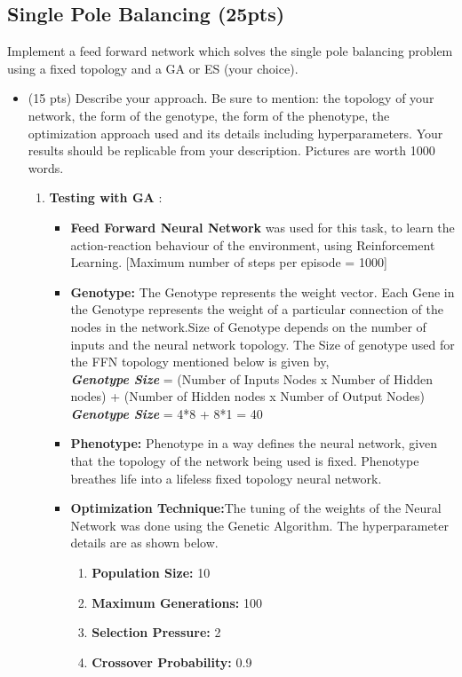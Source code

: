 \documentclass{article}
\begin{document}
\subsection{Single Pole Balancing (25pts)}
Implement a feed forward network which solves the single pole balancing problem using a fixed topology and a GA or ES (your choice).
\begin{itemize}
	\item (15 pts) Describe your approach. Be sure to mention: the topology of your network, the form of the genotype, the form of the phenotype, the optimization approach used and its details including hyperparameters. Your results should be replicable from your description. Pictures are worth 1000 words.
\color{blue}
\begin{enumerate}
	\item \textbf{Testing with GA} :
	\begin{itemize}
	\item \textbf{Feed Forward Neural Network} was used for this task, to learn the action-reaction behaviour of the environment, using Reinforcement Learning. [Maximum number of steps per episode = 1000]
	\item \textbf{Genotype:} The Genotype represents the weight vector. Each Gene in the Genotype represents the weight of a particular connection of the nodes in the network.Size of Genotype depends on the number of inputs and the neural network topology. The Size of genotype used for the FFN topology mentioned below is given by, \\
	\textit{\textbf{Genotype Size}} = (Number of Inputs Nodes x Number of Hidden nodes) + (Number of Hidden nodes x Number of Output Nodes)\\
	\textbf{\textit{Genotype Size}} = 4*8 + 8*1 = 40
	\item \textbf{Phenotype:} Phenotype in a way defines the neural network, given that the topology of the network being used is fixed. Phenotype breathes life into a lifeless fixed topology neural network.
	\item \textbf{Optimization Technique:}The tuning of the weights of the Neural Network was done using the Genetic Algorithm. The hyperparameter details are as shown below.
	\begin{enumerate}
	\item \textbf{Population Size:} 10
	\item \textbf{Maximum Generations:} 100
	\item \textbf{Selection Pressure:} 2
	\item \textbf{Crossover Probability:} 0.9

\end{enumerate}
\end{itemize}
\end{enumerate}
\end{itemize}
\end{document}
